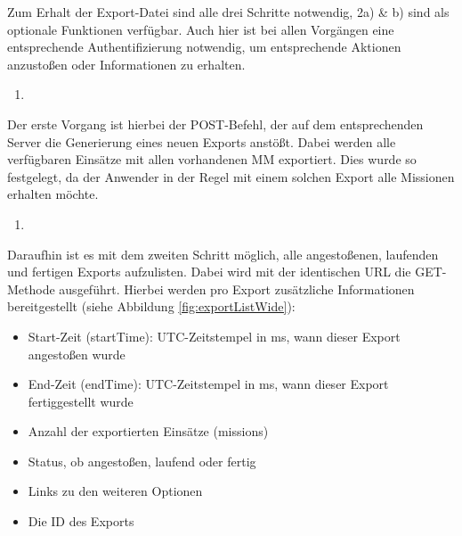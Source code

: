 Zum Erhalt der Export-Datei sind alle drei Schritte notwendig, 2a) \& b) sind als optionale Funktionen verfügbar.
Auch hier ist bei allen Vorgängen eine entsprechende Authentifizierung notwendig, um entsprechende Aktionen anzustoßen oder Informationen zu erhalten.

\begin{enumerate}
\item {}
\end{enumerate}
Der erste Vorgang ist hierbei der POST-Befehl, der auf dem entsprechenden Server die Generierung eines neuen Exports anstößt.
Dabei werden alle verfügbaren Einsätze mit allen vorhandenen \gls{MM} exportiert.
Dies wurde so festgelegt, da der Anwender in der Regel mit einem solchen Export alle Missionen erhalten möchte.

\begin{enumerate}[resume]
\item {}
\end{enumerate}

Daraufhin ist es mit dem zweiten Schritt möglich, alle angestoßenen, laufenden und fertigen Exports aufzulisten.
Dabei wird mit der identischen URL die GET-Methode ausgeführt.
Hierbei werden pro Export zusätzliche Informationen bereitgestellt (siehe Abbildung \ref{fig:exportListWide}): 


\begin{itemize}
\item Start-Zeit (\glqq startTime\grqq): UTC-Zeitstempel in ms, wann dieser Export angestoßen wurde
\item End-Zeit (\glqq endTime\grqq): UTC-Zeitstempel in ms, wann dieser Export fertiggestellt wurde
\item Anzahl der exportierten Einsätze (\glqq missions\grqq)
\item Status, ob angestoßen, laufend oder fertig
\item Links zu den weiteren Optionen
\item Die ID des Exports
\end{itemize}

